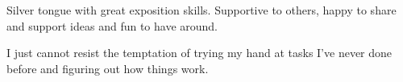\documentclass[11pt,a4paper,roman]{moderncv}
\begin{document}
{Silver tongue with great exposition skills. Supportive to others, happy to share and support ideas and fun to have around.}

{I just cannot resist the temptation of trying my hand at tasks I've never done before and figuring out how things work.}




\renewcommand{\listitemsymbol}{-~}            %



%


\end{document}
